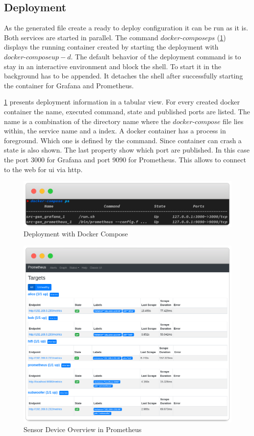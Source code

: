\subsection{Deployment}
As the generated file create a ready to deploy configuration it can be run as it is. Both services are started in parallel. The command $docker\text{-}compose ps$ (\cref{fig:deployment}) displays the running container created by starting the deployment with $docker\text{-}compose up -d$. The default behavior of the deployment command is to stay in an interactive environment and block the shell. To start it in the background  has to be appended. It detaches the shell after successfully starting the container for Grafana and Prometheus. 


\cref{fig:deployment} presents deployment information in a tabular view. For every created docker container the name, executed command, state and published ports are listed. The name is a combination of the directory name where the $docker\text{-}compose$ file lies within, the service name and a index. A docker container has a process in foreground. Which one is defined by the command. Since container can crash a state is also shown. The last property show which port are published. In this case the port 3000 for Grafana and port 9090 for Prometheus. This allows to connect to the web for \gls{ui} via \gls{http}.

\begin{figure}[!ht]
	\includegraphics[width=\linewidth]{assets/images/terminal2}
	\caption{Deployment with Docker Compose}
	\label{fig:deployment}
\end{figure}

\begin{figure}[!ht]
	\includegraphics[width=\linewidth]{assets/images/prometheus}
	\caption{Sensor Device Overview in Prometheus}
	\label{fig:prometheus}
\end{figure}


